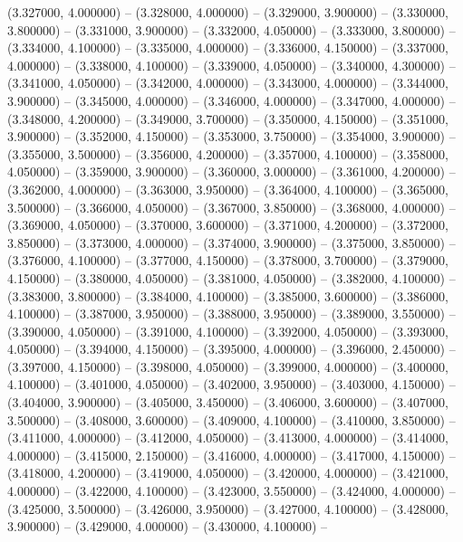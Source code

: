 (3.327000, 4.000000) -- 
(3.328000, 4.000000) -- 
(3.329000, 3.900000) -- 
(3.330000, 3.800000) -- 
(3.331000, 3.900000) -- 
(3.332000, 4.050000) -- 
(3.333000, 3.800000) -- 
(3.334000, 4.100000) -- 
(3.335000, 4.000000) -- 
(3.336000, 4.150000) -- 
(3.337000, 4.000000) -- 
(3.338000, 4.100000) -- 
(3.339000, 4.050000) -- 
(3.340000, 4.300000) -- 
(3.341000, 4.050000) -- 
(3.342000, 4.000000) -- 
(3.343000, 4.000000) -- 
(3.344000, 3.900000) -- 
(3.345000, 4.000000) -- 
(3.346000, 4.000000) -- 
(3.347000, 4.000000) -- 
(3.348000, 4.200000) -- 
(3.349000, 3.700000) -- 
(3.350000, 4.150000) -- 
(3.351000, 3.900000) -- 
(3.352000, 4.150000) -- 
(3.353000, 3.750000) -- 
(3.354000, 3.900000) -- 
(3.355000, 3.500000) -- 
(3.356000, 4.200000) -- 
(3.357000, 4.100000) -- 
(3.358000, 4.050000) -- 
(3.359000, 3.900000) -- 
(3.360000, 3.000000) -- 
(3.361000, 4.200000) -- 
(3.362000, 4.000000) -- 
(3.363000, 3.950000) -- 
(3.364000, 4.100000) -- 
(3.365000, 3.500000) -- 
(3.366000, 4.050000) -- 
(3.367000, 3.850000) -- 
(3.368000, 4.000000) -- 
(3.369000, 4.050000) -- 
(3.370000, 3.600000) -- 
(3.371000, 4.200000) -- 
(3.372000, 3.850000) -- 
(3.373000, 4.000000) -- 
(3.374000, 3.900000) -- 
(3.375000, 3.850000) -- 
(3.376000, 4.100000) -- 
(3.377000, 4.150000) -- 
(3.378000, 3.700000) -- 
(3.379000, 4.150000) -- 
(3.380000, 4.050000) -- 
(3.381000, 4.050000) -- 
(3.382000, 4.100000) -- 
(3.383000, 3.800000) -- 
(3.384000, 4.100000) -- 
(3.385000, 3.600000) -- 
(3.386000, 4.100000) -- 
(3.387000, 3.950000) -- 
(3.388000, 3.950000) -- 
(3.389000, 3.550000) -- 
(3.390000, 4.050000) -- 
(3.391000, 4.100000) -- 
(3.392000, 4.050000) -- 
(3.393000, 4.050000) -- 
(3.394000, 4.150000) -- 
(3.395000, 4.000000) -- 
(3.396000, 2.450000) -- 
(3.397000, 4.150000) -- 
(3.398000, 4.050000) -- 
(3.399000, 4.000000) -- 
(3.400000, 4.100000) -- 
(3.401000, 4.050000) -- 
(3.402000, 3.950000) -- 
(3.403000, 4.150000) -- 
(3.404000, 3.900000) -- 
(3.405000, 3.450000) -- 
(3.406000, 3.600000) -- 
(3.407000, 3.500000) -- 
(3.408000, 3.600000) -- 
(3.409000, 4.100000) -- 
(3.410000, 3.850000) -- 
(3.411000, 4.000000) -- 
(3.412000, 4.050000) -- 
(3.413000, 4.000000) -- 
(3.414000, 4.000000) -- 
(3.415000, 2.150000) -- 
(3.416000, 4.000000) -- 
(3.417000, 4.150000) -- 
(3.418000, 4.200000) -- 
(3.419000, 4.050000) -- 
(3.420000, 4.000000) -- 
(3.421000, 4.000000) -- 
(3.422000, 4.100000) -- 
(3.423000, 3.550000) -- 
(3.424000, 4.000000) -- 
(3.425000, 3.500000) -- 
(3.426000, 3.950000) -- 
(3.427000, 4.100000) -- 
(3.428000, 3.900000) -- 
(3.429000, 4.000000) -- 
(3.430000, 4.100000) -- 
